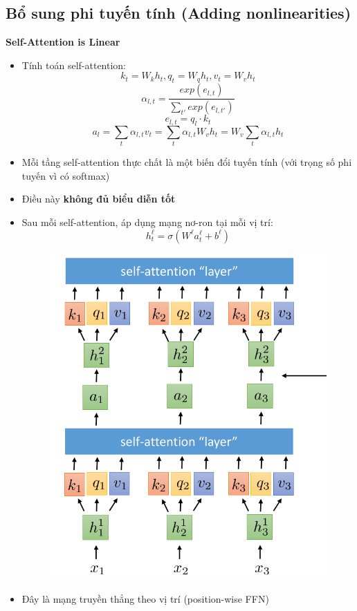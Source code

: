 \documentclass{book}
\begin{document}
    \subsection{Bổ sung phi tuyến tính (Adding nonlinearities)}
    \textbf{Self-Attention is Linear}
    \begin{itemize}
        \item Tính toán self-attention:
        \[
        k_t = W_k h_t, q_t = W_q h_t, v_t = W_v h_t
        \]
        \[
        \alpha_{l,t} = \frac{exp(e_{l,t})}{\sum_{t'}exp(e_{l,t'})}
        \]
        \[
        e_{l,t} = q_l \cdot k_t
        \]
        \[
        a_l = \sum_t \alpha_{l,t} v_t = \sum_t \alpha_{l,t} W_v h_t = W_v \sum_t \alpha_{l,t} h_t
        \]
        \item Mỗi tầng self-attention thực chất là một biến đổi tuyến tính (với trọng số phi tuyến vì có softmax)
        \item Điều này \textbf{không đủ biểu diễn tốt}
    \end{itemize}
        \begin{itemize}
        \item Sau mỗi self-attention, áp dụng mạng nơ-ron tại mỗi vị trí:
        \[
        h_t^{\ell} = \sigma(W^{\ell} a_t^{\ell} + b^{\ell})
        \]
        \begin{figure}[H]
            \centering
            \includegraphics[width=0.4\linewidth]{images/nonlinear.png}
    
        \end{figure}
        \item Đây là mạng truyền thẳng theo vị trí (position-wise FFN)
    \end{itemize}
\end{document}
